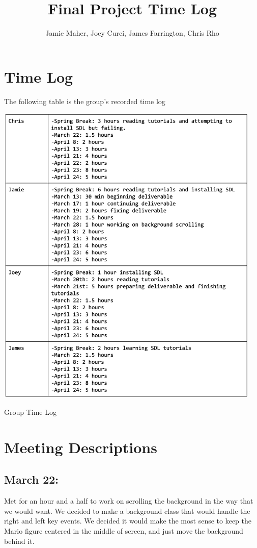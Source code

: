 \documentclass[letterpaper]{article}
\title{Final Project Time Log}
\date{}
\author{Jamie Maher, Joey Curci, James Farrington, Chris Rho}
\begin{document}
\maketitle
\section*{Time Log}

The following table is the group's recorded time log

\begin{table}[h!]
\centering
\includegraphics[width=5in]{table.png}
\caption{Group Time Log}
\end{table}
\section*{Meeting Descriptions}

\subsection*{March 22:}
Met for an hour and a half to work on scrolling the background in the way that we would want. We decided to make a background class that would handle the right and left key events. We decided it would make the most sense to keep the Mario figure centered in the middle of screen, and just move the background behind it.
\end{document}
